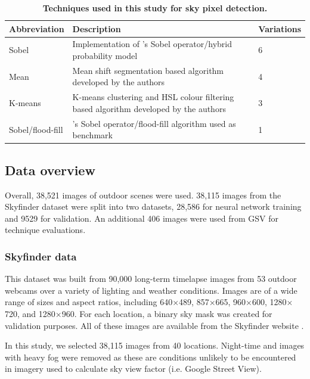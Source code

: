 \documentclass[final,3p,times,authoryear]{elsarticle}
\begin{document}
\begin{table}[!htbp]
\caption{\bf Techniques used in this study for sky pixel detection.  \label{tab:techniques}}     
\begin{tabular}{ l l l}
\textbf{Abbreviation} & \textbf{Description} & \textbf{Variations}  \\ \hline
Sobel  & Implementation of \cite{Wang2015a}'s Sobel operator/hybrid probability model & 6 \\	
Mean &  Mean shift segmentation based algorithm developed by the authors &4 \\
K-means  & K-means clustering and HSL colour filtering based algorithm developed by the authors &3 \\
\hline
Sobel/flood-fill  & \cite{Middel2018}'s Sobel operator/flood-fill algorithm used as benchmark &1 \\
\hline
\end{tabular}
\end{table}


\subsection{Data overview}\label{sec:data}
Overall, 38,521 images of outdoor scenes were used. 38,115 images from the Skyfinder dataset were split into two datasets, 28,586 for neural network training and 9529 for validation. An additional 406 images were used from GSV for technique evaluations.

\subsubsection{Skyfinder data}\label{sec:finderdata}
This dataset was built from 90,000 long-term timelapse images from 53 outdoor webcams over a variety of lighting and weather conditions. Images are of a wide range of sizes and aspect ratios, including 640$\times$489, 857$\times$665, 960$\times$600, 1280$\times$720, and 1280$\times$960. For each location, a binary sky mask was created for validation purposes. All of these images are available from the Skyfinder website \citep{Mihail2015}.

In this study, we selected 38,115 images from 40 locations. Night-time and images with heavy fog were removed as these are conditions unlikely to be encountered in imagery used to calculate sky view factor (i.e. Google Street View).
\end{document}

